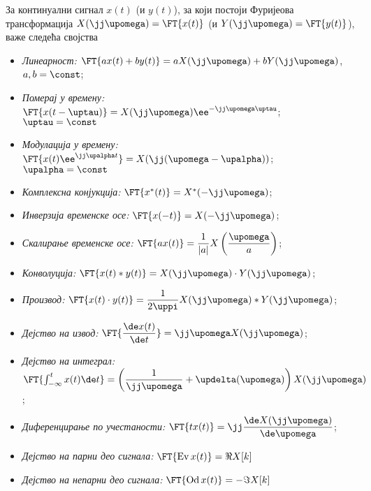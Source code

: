 
За континуални сигнал $x(t)$ (и $y(t)$), за који постоји Фуријеова трансформација
$X(\jj\upomega) = \FT{x(t)}$ (и $Y(\jj\upomega) = \FT{y(t)}$), важе следећа својства
\begin{itemize}
    \item \emph{Линеарност:} $\FT{ax(t) + by(t)} = a X(\jj\upomega) + b Y(\jj\upomega)$, \qquad $a,b = \const$;
    \item \emph{Померај у времену:} $\FT{x(t-\uptau)} = X(\jj\upomega) \ee^{-\jj\upomega \uptau}$; \qquad $\uptau = \const$
    \item \emph{Модулација у времену:} $\FT{x(t) \ee^{\jj\upalpha t}} = X(\jj(\upomega - \upalpha))$; \qquad $\upalpha = \const$
    \item \emph{Комплексна конјукција:} $\FT{x^{\ast}(t) } = X^{\ast}(-\jj\upomega)$; 
    \item \emph{Инверзија временске осе:} $\FT{x(-t) } = X(-\jj\upomega)$; 
    \item \emph{Скалирање временске осе:} $\FT{a x(t)} = \dfrac{1}{|a|} X\left( \dfrac{\upomega}{a} \right)$;
    \item \emph{Конволуција:} $\FT{x(t) \ast y(t)} = X(\jj\upomega) \cdot Y(\jj\upomega)$; 
    \item \emph{Производ:} $ \FT{x(t) \cdot y(t)} = \dfrac{1}{2\uppi} X(\jj\upomega) \ast Y(\jj\upomega)$;
    \item \emph{Дејство на извод:} $ \FT{ \dfrac{ \de x(t)}{\de t}} = \jj\upomega X(\jj\upomega)$;
    \item \emph{Дејство на интеграл:} $ \FT{ \int_{-\infty}^{t} x(t) \de t} =  
    \left( 
        \dfrac{1}{\jj\upomega} + \updelta(\upomega)
    \right) X(\jj\upomega)$;
    \item \emph{Диференцирање по учестаности:} 
    $
    \FT{ t x(t) } = \jj \dfrac{\de X(\jj\upomega)}{\de \upomega}
    $;
    \item \emph{Дејство на парни део сигнала:}
    $
    \FT{ \operatorname{Ev}x(t)} = \Re{X[k]}
    $
    \item \emph{Дејство на непарни део сигнала:}
    $
    \FT{ \operatorname{Od}x(t)} = -\Im{X[k]}
    $
    
\end{itemize} 